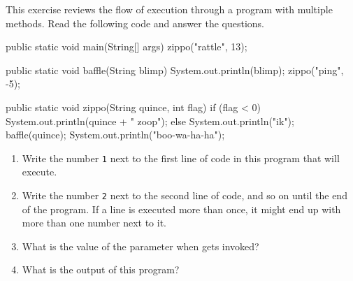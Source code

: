 \begin{exercise}  %

This exercise reviews the flow of execution through a program with multiple methods.
Read the following code and answer the questions.

\begin{code}
public static void main(String[] args) {
    zippo("rattle", 13);
}
\end{code}

\begin{code}
public static void baffle(String blimp) {
    System.out.println(blimp);
    zippo("ping", -5);
}
\end{code}

\begin{code}
public static void zippo(String quince, int flag) {
    if (flag < 0) {
        System.out.println(quince + " zoop");
    } else {
        System.out.println("ik");
        baffle(quince);
        System.out.println("boo-wa-ha-ha");
    }
}
\end{code}

\begin{enumerate}

\item Write the number {\tt 1} next to the first line of code in this program that will execute.

\item Write the number {\tt 2} next to the second line of code, and so on until the end of the program.
If a line is executed more than once, it might end up with more than one number next to it.

\item What is the value of the parameter  when  gets invoked?

\item What is the output of this program?

\end{enumerate}

\end{exercise}


